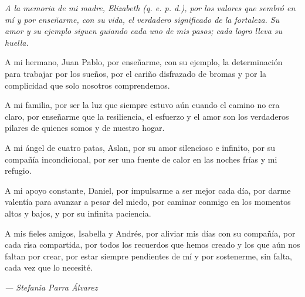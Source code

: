 \begin{center}
	{\itshape
		A la memoria de mi madre, Elizabeth (q. e. p. d.), por los valores que sembró en mí y por enseñarme, con su vida, el verdadero significado de la fortaleza. Su amor y su ejemplo siguen guiando cada uno de mis pasos; cada logro lleva su huella. 

		A mi hermano, Juan Pablo, por enseñarme, con su ejemplo, la determinación para trabajar por los sueños, por el cariño disfrazado de bromas y por la complicidad que solo nosotros comprendemos. 

		A mi familia, por ser la luz que siempre estuvo aún cuando el camino no era claro, por enseñarme que la resiliencia, el esfuerzo y el amor son los verdaderos pilares de quienes somos y de nuestro hogar. 

		A mi ángel de cuatro patas, Aslan, por su amor silencioso e infinito, por su compañía incondicional, por ser una fuente de calor en las noches frías y mi refugio. 

		A mi apoyo constante, Daniel, por impulsarme a ser mejor cada día, por darme valentía para avanzar a pesar del miedo, por caminar conmigo en los momentos altos y bajos, y por su infinita paciencia.

		A mis fieles amigos, Isabella y Andrés, por aliviar mis días con su compañía, por cada risa compartida, por todos los recuerdos que hemos creado y los que aún nos faltan por crear, por estar siempre pendientes de mí y por sostenerme, sin falta, cada vez que lo necesité.
	}

	\vspace{1cm}

	\hfill \textit{--- Stefania Parra Álvarez}
\end{center}
